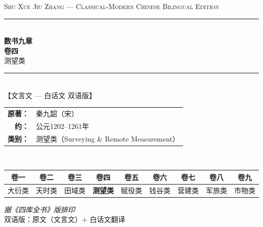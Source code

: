 \documentclass[11pt,a4paper]{article}
\begin{document}
\begin{titlepage}
\centering
\vspace*{2cm}

{\fontsize{11}{13}\selectfont\textsc{Shu Xue Jiu Zhang — Classical-Modern Chinese Bilingual Edition}}\\[0.3cm]
{\color{rulecolor}\rule{8cm}{0.5pt}}\\[0.6cm]

{\fontsize{28}{34}\selectfont\textcolor{titlecolor}{\textbf{数书九章}}}\\[0.5cm]
{\fontsize{22}{26}\selectfont\textcolor{sectioncolor}{\textbf{卷四}}}\\[0.3cm]
{\fontsize{16}{20}\selectfont\textcolor{subsectioncolor}{测望类}}\\[0.8cm]

{\color{rulecolor}\rule{8cm}{0.5pt}}\\[0.5cm]

{\Large\textcolor{origcolor}{【文言文 — 白话文 双语版】}}\\[1cm]

{\large
\begin{tabular}{rl}
\textbf{原著：} & 秦九韶（宋） \\[0.4em]
\textbf{约：} & 公元1202--1261年 \\[0.4em]
\textbf{类别：} & 测望类（Surveying \& Remote Measurement） \\
\end{tabular}
}\\[1cm]

{\large
\begin{tabular}{|c|c|c|c|c|c|c|c|c|}
\hline
\textbf{卷一} & \textbf{卷二} & \textbf{卷三} & \textbf{卷四} & \textbf{卷五} & \textbf{卷六} & \textbf{卷七} & \textbf{卷八} & \textbf{卷九} \\
\hline
大衍类 & 天时类 & 田域类 & \cellcolor{sectioncolor!20}\textbf{测望类} & 赋役类 & 钱谷类 & 营建类 & 军旅类 & 市物类 \\
\hline
\end{tabular}
}

\vfill

{\small\textit{据《四库全书》版排印}}\\[0.2cm]
{\small 双语版：原文（文言文）+ 白话文翻译}

\end{titlepage}

\tableofcontents
\newpage

\end{document}
